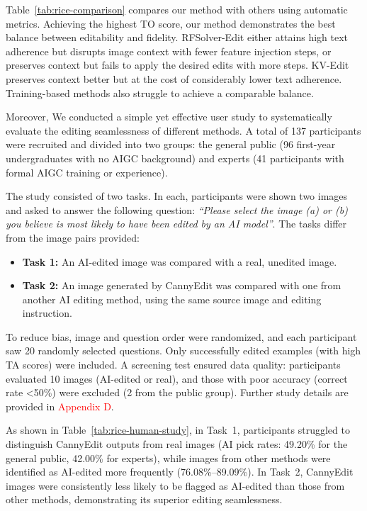 \documentclass{article}
\begin{document}
Table~\ref{tab:rice-comparison} compares our method with others using automatic metrics. Achieving the highest TO score, our method demonstrates the best balance between editability and fidelity. RFSolver-Edit either attains high text adherence but disrupts image context with fewer feature injection steps, or preserves context but fails to apply the desired edits with more steps. KV-Edit preserves context better but at the cost of considerably lower text adherence. Training-based methods also struggle to achieve a comparable balance.

Moreover, We conducted a simple yet effective user study to systematically evaluate the editing seamlessness of different methods. A total of 137 participants were recruited and divided into two groups: the general public (96 first-year undergraduates with no AIGC background) and experts (41 participants with formal AIGC training or experience).

The study consisted of two tasks. In each, participants were shown two images and asked to answer the following question: \emph{``Please select the image (a) or (b) you believe is most likely to have been edited by an AI model''}. The tasks differ from the image pairs provided:
\vspace{-1.8mm}
\begin{itemize}
    \item \textbf{Task 1:} An AI-edited image was compared with a real, unedited image.
    \vspace{-1.5mm}
    \item \textbf{Task 2:} An image generated by CannyEdit was compared with one from another AI editing method, using the same source image and editing instruction.
\end{itemize}
\vspace{-1.8mm}
To reduce bias, image and question order were randomized, and each participant saw 20 randomly selected questions. Only successfully edited examples (with high TA scores) were included. A screening test ensured data quality: participants evaluated 10 images (AI-edited or real), and those with poor accuracy (correct rate <50\%) were excluded (2 from the public group). Further study details are provided in \textcolor{red}{Appendix D}.

As shown in Table~\ref{tab:rice-human-study}, in Task~1, participants struggled to distinguish CannyEdit outputs from real images (AI pick rates: 49.20\% for the general public, 42.00\% for experts), while images from other methods were identified as AI-edited more frequently (76.08\%--89.09\%). In Task~2, CannyEdit images were consistently less likely to be flagged as AI-edited than those from other methods, demonstrating its superior editing seamlessness.
\end{document}
